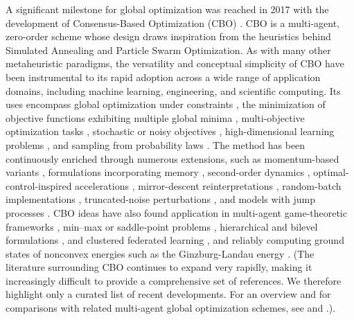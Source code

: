 \documentclass[reqno]{amsart}
\numberwithin{algorithm}{section}
\begin{document}
{A significant milestone for global optimization was reached in 2017 with the development of Consensus-Based Optimization (CBO) \cite{pinnau2017consensus}. CBO is a multi-agent, zero-order scheme whose design draws inspiration from the heuristics behind Simulated Annealing and Particle Swarm Optimization.
{As with many other metaheuristic paradigms, the versatility and conceptual simplicity of CBO have been instrumental to its rapid adoption across a wide range of application domains, including machine learning, engineering, and scientific computing. Its uses encompass global optimization under constraints \cite{fornasier2020consensus_hypersurface_wellposedness,B1-fornasier2020consensus_sphere_convergence,bae2022constrained,beddrich2024,B1-carrillo2021consensus,B1-borghi2021constrained,B1-ha2021emergent}, the minimization of objective functions exhibiting multiple global minima \cite{bungert2022polarized,B1-fornasierSun25,huang2025faithful}, multi-objective optimization tasks \cite{borghi2022consensus,borghi2022adaptive,totzek-multio}, stochastic or noisy objectives \cite{bellavia25,bonandin2024}, high-dimensional learning problems \cite{B1-carrillo2019consensus}, and sampling from probability laws \cite{B1-carrillo2022sampling}.
The method has been continuously enriched through numerous extensions, such as momentum-based variants \cite{CiCP-31-4}, formulations incorporating memory \cite{totzeck2020consensus,riedl2022leveraging,huang_self-interacting_2025}, second-order dynamics \cite{2ndorder,B1-cipriani2021zero,B1-grassi2021mean,grassi2020particle,hui23}, optimal-control-inspired accelerations \cite{huang2024fast}, mirror-descent reinterpretations \cite{bungert2025mirror}, random-batch implementations \cite{ko2022convergence}, truncated-noise perturbations \cite{fornasier2023consensus1}, and models with jump processes \cite{kalise2022consensus}.
CBO ideas have also found application in multi-agent game-theoretic frameworks \cite{chenchene2024}, min–max or saddle-point problems \cite{B1-qiu2022Saddlepoints,borghi2024particle}, hierarchical and bilevel formulations \cite{multilevel,trillos2025cb2o}, and clustered federated learning \cite{JMLR:v25:23-0764}, and reliably computing ground states of nonconvex energies such as the Ginzburg-Landau energy \cite{beddrich2024}. (The literature surrounding CBO continues to expand very rapidly, making it increasingly difficult to provide a comprehensive set of references. We therefore highlight only a curated list of recent developments. For an overview and for comparisons with related multi-agent global optimization schemes, see \cite{totzeck2021trends} and \cite{totzeck2018numerical}.).
}

}
\end{document}
